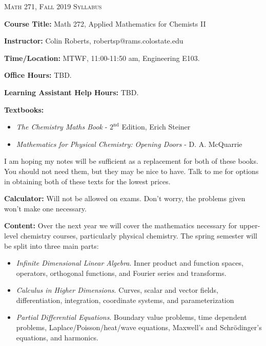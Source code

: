 \documentclass[12pt]{amsbook}
\begin{document}

\SetWatermarkText{
\begin{minipage}[c][8cm]{8cm}
\begin{center}
 
\end{center}
\end{minipage}
}



\begin{center}
   \textsc{\large Math 271, Fall 2019 Syllabus}
\end{center}
\vspace{.5cm}

\textbf{Course Title:} Math 272, Applied Mathematics for Chemists II

\textbf{Instructor:} Colin Roberts, robertsp@rams.colostate.edu

\textbf{Time/Location:} MTWF, 11:00-11:50 am, Engineering E103.  

\textbf{Office Hours:} TBD.

\textbf{Learning Assistant Help Hours:} TBD.

\textbf{Textbooks:} \begin{itemize}
    \item \emph{The Chemistry Maths Book} - $2^{\text{nd}}$ Edition, Erich Steiner
    \item \emph{Mathematics for Physical Chemistry: Opening Doors} - D. A. McQuarrie
\end{itemize}
I am hoping my notes will be sufficient as a replacement for both of these books.  You should not need them, but they may be nice to have.  Talk to me for options in obtaining both of these texts for the lowest prices.

\textbf{Calculator:} Will not be allowed on exams.  Don't worry, the problems given won't make one necessary.

\textbf{Content:} Over the next year we will cover the mathematics necessary for upper-level chemistry courses, particularly physical chemistry. The spring semester will be split into three main parts:
\begin{itemize}
    \item \emph{Infinite Dimensional Linear Algebra}. Inner product and function spaces, operators, orthogonal functions, and Fourier series and transforms.
    \item \emph{Calculus in Higher Dimensions}. Curves, scalar and vector fields, differentiation, integration, coordinate systems, and parameterization
    \item \emph{Partial Differential Equations}. Boundary value problems, time dependent problems, Laplace/Poisson/heat/wave equations, Maxwell's and Schr\"odinger's equations, and harmonics.
\end{itemize}
\end{document}
